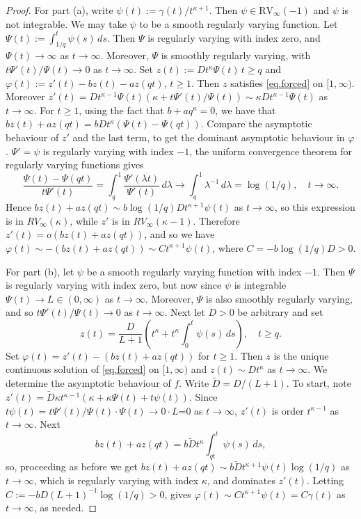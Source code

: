 \documentclass[a4paper,10pt,reqno]{amsart}
\numberwithin{equation}{section}
\theoremstyle{definition}
\theoremstyle{remark}
\DeclareMathOperator{\1}{\mathbbm 1}
\begin{document}
	\begin{proof}
		For part (a), write $\psi(t):=\gamma(t)/t^{\kappa+1}$. Then $\psi\in \text{RV}_\infty(-1)$ and $\psi$ is not integrable. We may take $\psi$ to be a smooth regularly varying function. Let $\Psi(t):=\int_{1/q}^t \psi(s)\,ds$.
		Then $\Psi$ is regularly varying with index zero, and $\Psi(t)\to \infty$ as $t\to\infty$. Moreover, $\Psi$ is smoothly regularly varying, with $t\Psi'(t)/\Psi(t)\to 0$ as $t\to\infty$. Set $z(t):=Dt^\kappa \Psi(t)\,t\geq q$ and $\varphi(t):=z'(t)-bz(t)-az(qt), \,t\geq 1$. Then $z$ satisfies \eqref{eq.forced} on $[1,\infty)$. Moreover  
		$z'(t)=Dt^{\kappa-1}\Psi(t)(\kappa+t\Psi'(t)/\Psi(t))\sim \kappa Dt^{\kappa-1}\Psi(t)$ as $t\to\infty$. 	For $t\geq 1$, using the fact that $b+aq^\kappa=0$, we have that
		$bz(t)+az(qt) = bDt^\kappa(\Psi(t)-\Psi(qt))$. Compare the asymptotic behaviour of $z'$ and the last term, to get the dominant asymptotic behaviour in $\varphi$.  $\Psi'=\psi$ is regularly varying with index $-1$, the uniform convergence theorem for regularly varying functions gives 
		\[
		\frac{\Psi(t)-\Psi(qt)}{t\Psi'(t)}=\int_q^1 \frac{\Psi'(\lambda t)}{\Psi'(t)}\,d\lambda
		\to \int_q^1 \lambda^{-1}\,d\lambda = \log(1/q), \quad t\to\infty.
		\]
		Hence 
		$bz(t)+az(qt) \sim b \log(1/q) D t^{\kappa+1} \psi(t)$ as $t\to\infty$, 
		so this expression is in $RV_{\infty}(\kappa)$, while $z'$ is in $RV_{\infty}(\kappa-1)$. Therefore $z'(t)=o(bz(t)+az(qt))$, and so  we have
		$\varphi(t)\sim -(bz(t)+az(qt)) \sim C t^{\kappa+1} \psi(t)$, where $C=-b \log(1/q) D>0$.
		
		For part (b), let $\psi$ be a smooth regularly varying function with index $-1$. Then $\Psi$ is regularly varying with index zero, but now since $\psi$ is integrable $\Psi(t)\to L\in (0,\infty)$ as $t\to\infty$. Moreover, $\Psi$ is also smoothly regularly varying, and so $t\Psi'(t)/\Psi(t)\to 0$ as $t\to\infty$. Next let $D>0$ be arbitrary and set
		\[
		z(t)=\frac{D}{L+1}\left(t^\kappa + t^\kappa\int_0^t \psi(s)\,ds\right), \quad t\geq q.
		\]
		Set $\varphi(t)=z'(t)-(bz(t)+az(qt))$ for $t\geq 1$. Then $z$ is the unique continuous solution of \eqref{eq.forced} on $[1,\infty)$ and $z(t)\sim Dt^\kappa$ as $t\to\infty$. We determine the asymptotic behaviour of $f$. Write $\tilde{D}=D/(L+1)$. To start, note $z'(t)=\tilde{D}\kappa t^{\kappa-1}\left(\kappa+ \kappa \Psi(t) +  t\psi(t)\right)$. 
		Since $t\psi(t)=t\Psi'(t)/\Psi(t)\cdot \Psi(t)\to 0\cdot L$=0 as $t\to\infty$, $z'(t)$ is
		order $t^{\kappa-1}$ as $t\to\infty$. Next
		\[
		bz(t)+az(qt) = b\tilde{D} t^\kappa \int_{qt}^t \psi(s)\,ds,
		\]
		so, proceeding as before we get 
		$bz(t)+az(qt) \sim b \tilde{D}t^{\kappa+1} \psi(t)\log(1/q)$ as $t\to\infty$, which is regularly varying with index $\kappa$, and dominates $z'(t)$. Letting  $C:=-bD(L+1)^{-1}\log(1/q)>0$, gives  $\varphi(t)\sim C t^{\kappa+1} \psi(t)=C\gamma(t)$ as $t\to\infty$, as needed.  
	\end{proof}
\end{document}
